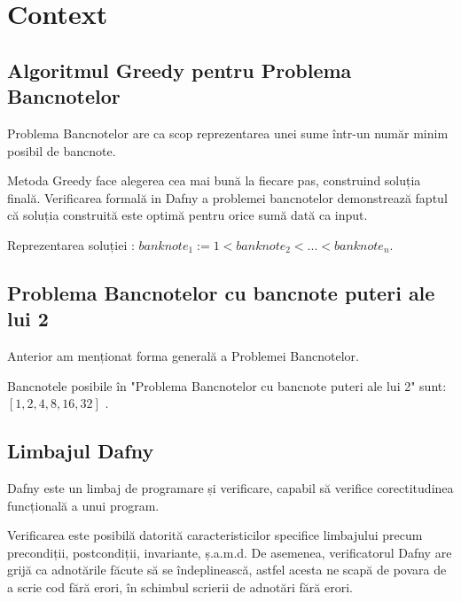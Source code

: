 


\chapter{Context} 

\section{Algoritmul Greedy pentru Problema Bancnotelor} 
Problema Bancnotelor are ca scop reprezentarea unei sume într-un număr minim posibil de bancnote.\par
Metoda Greedy face alegerea cea mai bună la fiecare pas, construind soluția finală.
Verificarea formală in Dafny a problemei bancnotelor demonstrează faptul că soluția construită este optimă
pentru orice sumă dată ca input. \par
Reprezentarea soluției :
$ banknote_{1}:= 1 < banknote_{2} < ... < banknote_{n} $. 


\section{Problema Bancnotelor cu bancnote puteri ale lui 2}
Anterior am menționat forma generală a Problemei Bancnotelor.\par
Bancnotele posibile în "Problema Bancnotelor cu bancnote puteri ale lui 2" sunt: 
$[1, 2, 4, 8, 16, 32]$ . 

\section{Limbajul Dafny} 
Dafny este un limbaj de programare și verificare, capabil să verifice corectitudinea
 funcțională a unui program.\par
Verificarea este posibilă datorită caracteristicilor specifice limbajului precum precondiții, postcondiții, 
invariante, ș.a.m.d. De asemenea, verificatorul Dafny are grijă ca adnotările făcute să se îndeplinească,
astfel acesta ne scapă de povara de a scrie cod fără erori, în schimbul scrierii de adnotări fără erori.